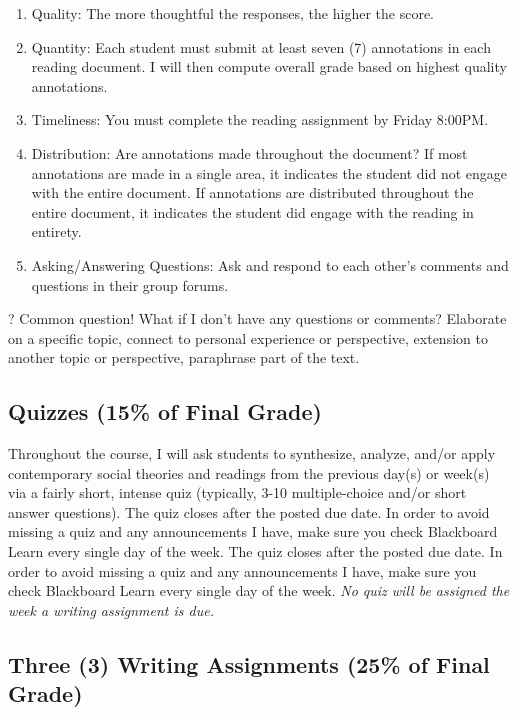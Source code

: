 \documentclass[11pt,]{article}
\providecommand{\tightlist}{%
  \setlength{\itemsep}{0pt}\setlength{\parskip}{0pt}}
\begin{document}
\begin{enumerate}
\def\labelenumi{\arabic{enumi}.}
\tightlist
\item
  Quality: The more thoughtful the responses, the higher the score.
\item
  Quantity: Each student must submit at least seven (7) annotations in
  each reading document. I will then compute overall grade based on
  highest quality annotations.
\item
  Timeliness: You must complete the reading assignment by Friday 8:00PM.
\item
  Distribution: Are annotations made throughout the document? If most
  annotations are made in a single area, it indicates the student did
  not engage with the entire document. If annotations are distributed
  throughout the entire document, it indicates the student did engage
  with the reading in entirety.
\item
  Asking/Answering Questions: Ask and respond to each other's comments
  and questions in their group forums.
\end{enumerate}

? Common question! What if I don't have any questions or comments?
Elaborate on a specific topic, connect to personal experience or
perspective, extension to another topic or perspective, paraphrase part
of the text.

\hypertarget{quizzes-15-of-final-grade}{%
\subsection{Quizzes (15\% of Final
Grade)}\label{quizzes-15-of-final-grade}}

Throughout the course, I will ask students to synthesize, analyze,
and/or apply contemporary social theories and readings from the previous
day(s) or week(s) via a fairly short, intense quiz (typically, 3-10
multiple-choice and/or short answer questions). The quiz closes after
the posted due date. In order to avoid missing a quiz and any
announcements I have, make sure you check Blackboard Learn every single
day of the week. The quiz closes after the posted due date. In order to
avoid missing a quiz and any announcements I have, make sure you check
Blackboard Learn every single day of the week. \emph{No quiz will be
assigned the week a writing assignment is due.}

\hypertarget{writing_assignments}{%
\subsection{Three (3) Writing Assignments (25\% of Final
Grade)}\label{writing_assignments}}
\end{document}
